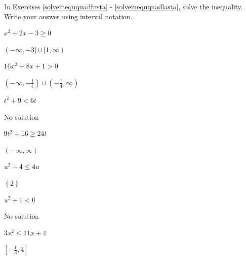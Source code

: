 \documentclass{ximera}
\begin{document}
\begin{question}
In Exercises \ref{solveineququadfirsta} - \ref{solveineququadlasta}, solve the inequality.  Write your answer using interval notation.

\begin{problem}\label{solveineququadfirsta}
$x^{2} + 2x - 3 \geq 0$

\begin{solution}
    $(-\infty, -3] \cup [1, \infty)$
\end{solution}
\end{problem}

\begin{problem}
$16x^2+8x+1 > 0$

\begin{solution}
     $\left(-\infty, -\frac{1}{4}\right) \cup \left(-\frac{1}{4}, \infty \right)$
\end{solution}
\end{problem}

\begin{problem}
$t^2+9 < 6t$

\begin{solution}
     No solution
\end{solution}
\end{problem}

\begin{problem}
$9t^2 + 16 \geq 24t$

\begin{solution}
    $(-\infty, \infty)$
\end{solution}
\end{problem}

\begin{problem}
$u^2+4 \leq 4u$

\begin{solution}
    $\left\{2 \right\}$
\end{solution}
\end{problem}

\begin{problem}
$u^{2} + 1 < 0$

\begin{solution}
    No solution
\end{solution}
\end{problem}

\begin{problem}
$3x^{2} \leq 11x + 4$

\begin{solution}
    $\left[-\frac{1}{3}, 4 \right]$
\end{solution}
\end{problem}


\end{question}
\end{document}
